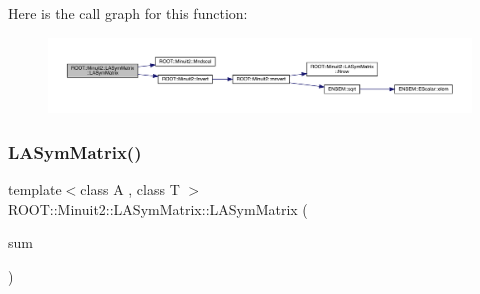 Here is the call graph for this function\+:
\nopagebreak
\begin{figure}[H]
\begin{center}
\leavevmode
\includegraphics[width=350pt]{d3/d72/classROOT_1_1Minuit2_1_1LASymMatrix_a0089b4055d0d08767d7072657b6f87d5_cgraph}
\end{center}
\end{figure}
\mbox{\label{classROOT_1_1Minuit2_1_1LASymMatrix_a50ecd9916b1ca8941c767d16dbdb9b65}} 
\subsubsection{\texorpdfstring{LASymMatrix()}{LASymMatrix()}\hspace{0.1cm}{\footnotesize\ttfamily [28/30]}}
{\footnotesize\ttfamily template$<$class A , class T $>$ \\
R\+O\+O\+T\+::\+Minuit2\+::\+L\+A\+Sym\+Matrix\+::\+L\+A\+Sym\+Matrix (\begin{DoxyParamCaption}\item[{const \mbox{\hyperlink{classROOT_1_1Minuit2_1_1ABObj}{A\+B\+Obj}}$<$ \mbox{\hyperlink{classROOT_1_1Minuit2_1_1sym}{sym}}, \mbox{\hyperlink{classROOT_1_1Minuit2_1_1ABSum}{A\+B\+Sum}}$<$ \mbox{\hyperlink{classROOT_1_1Minuit2_1_1ABObj}{A\+B\+Obj}}$<$ \mbox{\hyperlink{classROOT_1_1Minuit2_1_1sym}{sym}}, \mbox{\hyperlink{classROOT_1_1Minuit2_1_1MatrixInverse}{Matrix\+Inverse}}$<$ \mbox{\hyperlink{classROOT_1_1Minuit2_1_1sym}{sym}}, \mbox{\hyperlink{classROOT_1_1Minuit2_1_1ABObj}{A\+B\+Obj}}$<$ \mbox{\hyperlink{classROOT_1_1Minuit2_1_1sym}{sym}}, \mbox{\hyperlink{classROOT_1_1Minuit2_1_1LASymMatrix}{L\+A\+Sym\+Matrix}}, T $>$, T $>$, T $>$, \mbox{\hyperlink{classROOT_1_1Minuit2_1_1ABObj}{A\+B\+Obj}}$<$ \mbox{\hyperlink{classROOT_1_1Minuit2_1_1sym}{sym}}, A, T $>$ $>$, T $>$ \&}]{sum }\end{DoxyParamCaption})\hspace{0.3cm}{\ttfamily [inline]}}

